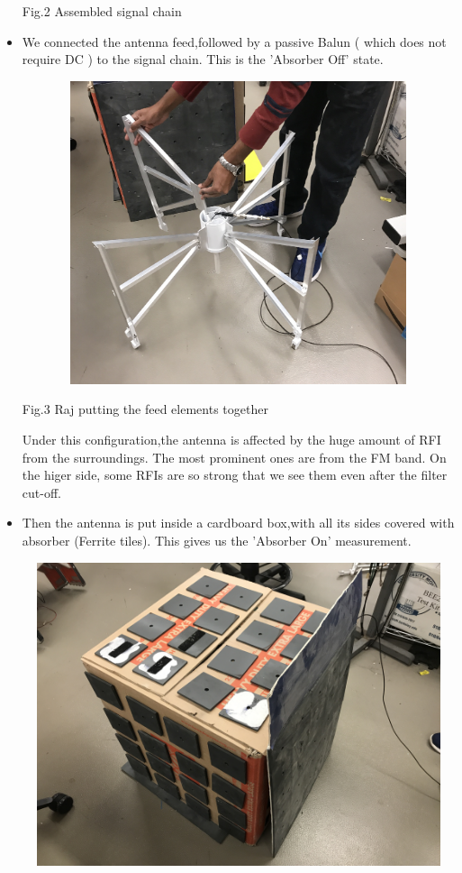 \documentclass[11pt]{article}
\begin{document}
\begin{itemize}
\begin{center}
			Fig.2 Assembled signal chain 
		\end{center}
	
		\item We connected the antenna feed,followed by a passive Balun ( which does not require DC ) to the signal chain. This is the 'Absorber Off' state.
		
		\begin{center}
		\includegraphics[angle=0,width=5in,height=3.5in]{feed.jpeg}
			
			Fig.3 Raj putting the feed elements together
		\end{center}	
		
	Under this configuration,the antenna is affected by the huge amount of RFI from the surroundings. The most  prominent ones are from the FM band. On the higer side,	some RFIs are so strong that we see them even after the filter cut-off.
		
		\item Then the antenna is put inside a cardboard box,with all its sides covered with absorber (Ferrite tiles). This gives us the 'Absorber On' measurement.
		\begin{center}
			\includegraphics[width=5in,height=3.5in]{box.jpeg}
			

\end{center}
\end{itemize}
\end{document}
